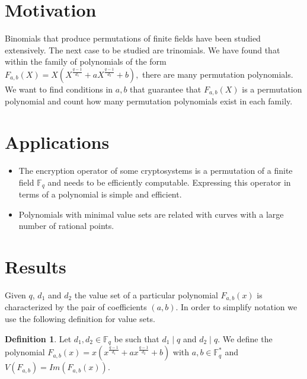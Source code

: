 \documentclass{article}
\theoremstyle{definition}
\newtheorem{definition}[theorem]{Definition}
\theoremstyle{remark}
\numberwithin{equation}{section}
\begin{document}
\section{Motivation}    

Binomials that produce permutations of finite fields have been studied extensively. The next case to be studied are trinomials. We have found that within the family of polynomials of the form $F_{a,b}(X) =X\left(X^{\frac{q-1}{d_1}} + a X^{\frac{q-1}{d_2}} + b \right),$ there are many permutation polynomials. We want to find conditions in $a,b$ that guarantee that $F_{a,b}(X)$ is a permutation polynomial and count how many permutation polynomials exist in each family.

\section{Applications}    

 \begin{itemize}

 \item The encryption operator of some cryptosystems is a permutation of a finite field $\mathbb{F}_{q}$ and needs to be efficiently computable. Expressing this operator in terms of a polynomial is simple and efficient.

 \item Polynomials with minimal value sets are related with curves with a large number of rational points.  

 \end{itemize}

\section{Results}

Given $q$, $d_1$ and $d_2$ the value set of a particular polynomial $F_{a,b}(x)$ is characterized by the pair of coefficients $(a,b)$. In order to simplify notation we use the following definition for value sets.

\begin{definition}
  Let $d_1, d_2 \in \mathbb{F}_q$ be such that $d_1 \mid q$ and $d_2 \mid q$. We define the polynomial $F_{a,b}(x) = x(x^{\frac{q-1}{d_1}} + ax^{\frac{q-1}{d_2}} +b)$ with $a,b \in \mathbb{F}_q^{*}$ and $V(F_{a,b}) = Im(F_{a,b}(x))$.
\end{definition}
\end{document}
